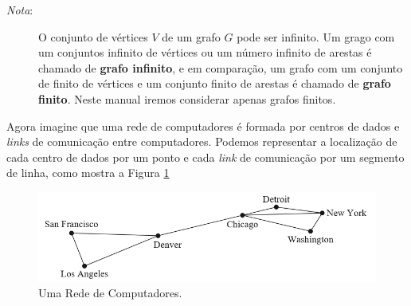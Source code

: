 \begin{description}
\item[\emph{Nota}:] O conjunto de vértices $V$ de um grafo $G$ pode ser
infinito. Um grago com um conjuntos infinito de vértices ou um
número infinito de arestas é chamado de \textbf{grafo infinito}, e em comparação, um grafo com
um conjunto de finito de vértices e um conjunto finito de arestas é chamado de
\textbf{grafo finito}. Neste manual iremos considerar apenas grafos finitos.
\end{description}

Agora imagine que uma rede de computadores é formada por centros de dados e
\textit{links} de comunicação entre computadores. Podemos representar a
localização de cada centro de dados por um ponto e cada \textit{link} de
comunicação por um segmento de linha, como mostra a Figura \ref{fig51}

\begin{figure}[H]
	\centering
	\includegraphics[scale=1]{chapter/imagens/51}
	\caption{Uma Rede de Computadores.}
	\label{fig51}
\end{figure}


